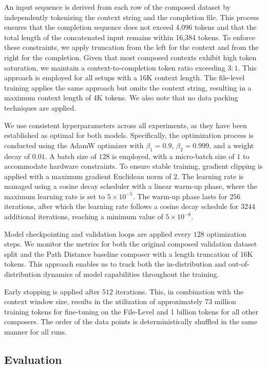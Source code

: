 An input sequence is derived from each row of the composed dataset by independently tokenizing the context string and the completion file. This process ensures that the completion sequence does not exceed 4,096 tokens and that the total length of the concatenated input remains within 16,384 tokens. To enforce these constraints, we apply truncation from the left for the context and from the right for the completion. Given that most composed contexts exhibit high token saturation, we maintain a context-to-completion token ratio exceeding \(3 : 1\). \parencite{sapronov2025} This approach is employed for all setups with a 16K context length. The file-level training applies the same approach but omits the context string, resulting in a maximum context length of 4K tokens. We also note that no data packing techniques are applied.

We use consistent hyperparameters across all experiments, as they have been established as optimal for both models. Specifically, the optimization process is conducted using the AdamW optimizer with \(\beta_1 = 0.9\), \(\beta_2 = 0.999\), and a weight decay of \(0.01\). A batch size of \(128\) is employed, with a micro-batch size of \(1\) to accommodate hardware constraints. To ensure stable training, gradient clipping is applied with a maximum gradient Euclidean norm of \(2\). The learning rate is managed using a cosine decay scheduler with a linear warm-up phase, where the maximum learning rate is set to \(5 \times 10^{-5}\). The warm-up phase lasts for \(256\) iterations, after which the learning rate follows a cosine decay schedule for \(3244\) additional iterations, reaching a minimum value of \(5 \times 10^{-8}\). \parencite{sapronov2025}

Model checkpointing and validation loops are applied every \(128\) optimization steps. We monitor the metrics for both the original composed validation dataset split and the Path Distance baseline composer with a length truncation of 16K tokens. This approach enables us to track both the in-distribution and out-of-distribution dynamics of model capabilities throughout the training.

Early stopping is applied after \(512\) iterations. This, in combination with the context window size, results in the utilization of approximately 73 million training tokens for fine-tuning on the File-Level and 1 billion tokens for all other composers. The order of the data points is deterministically shuffled in the same manner for all runs.

\subsection{Evaluation}\label{sec:evaluation}

